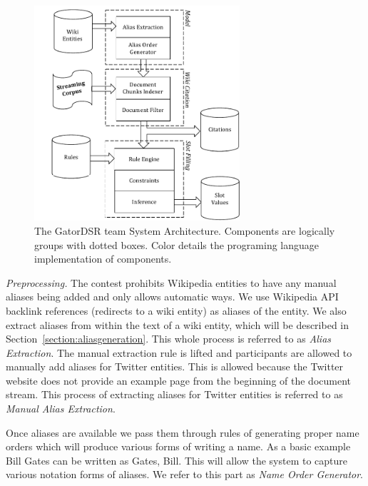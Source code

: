 \begin{figure}
  \centering
  \includegraphics[width=3in]{./images/System_Diagram_with_model_Vertical-crop.pdf}
  \vspace*{-.1in} 
  \caption{The GatorDSR team System Architecture.
  Components are logically groups with dotted boxes.
  Color details the programing language implementation of components.}
  \label{fig:system}
  \vspace*{-.2in}
\end{figure}



\textit{Preprocessing.}
The contest prohibits Wikipedia entities to have any manual aliases being added and only allows automatic ways. We use Wikipedia API backlink references (redirects to a wiki entity) as aliases of the entity. We also extract aliases from within the text of a wiki entity, which will be described in Section~\ref{section:aliasgeneration}. This whole process is referred to as \textit{Alias Extraction}. The manual extraction rule is lifted and participants are allowed to manually add aliases for Twitter entities. This is allowed because the Twitter website does not provide an example page from the beginning of the document stream. This process of extracting aliases for Twitter entities is referred to as \textit{Manual Alias Extraction}.

Once aliases are available we pass them through rules of generating proper name orders which will produce various forms of writing a name. As a basic example Bill Gates can be written as Gates, Bill. This will allow the system to capture various notation forms of aliases. We refer to this part as \textit{Name Order Generator}.

